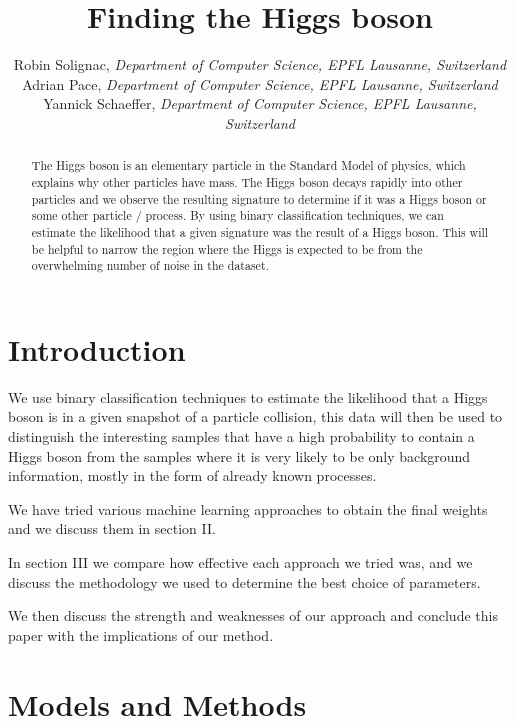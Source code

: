 \documentclass[10pt,conference,compsocconf]{IEEEtran}
\begin{document}
\title{Finding the Higgs boson}

\author{
  Robin Solignac,
  \textit{Department of Computer Science, EPFL Lausanne, Switzerland}\\
  Adrian Pace,
  \textit{Department of Computer Science, EPFL Lausanne, Switzerland}\\
  Yannick Schaeffer,
  \textit{Department of Computer Science, EPFL Lausanne, Switzerland}
}

\maketitle

\begin{abstract}
The Higgs boson is an elementary particle in the Standard Model of physics, which explains why other particles have mass. The Higgs boson decays rapidly into other particles and we observe the resulting signature to determine if it was a Higgs boson or some other particle / process. By using binary classification techniques, we can estimate the likelihood that a given signature was the result of a Higgs boson. This will be helpful to narrow the region where the Higgs is expected to be from the overwhelming number of noise in the dataset.
\end{abstract}

\section{Introduction}
We use binary classification techniques to estimate the likelihood that a Higgs boson is in a given snapshot of a particle collision, this data will then be used to distinguish the interesting samples that have a high probability to contain a Higgs boson from the samples where it is very likely to be only background information, mostly in the form of already known processes.

We have tried various machine learning approaches to obtain the final weights and we discuss them in section II.

In section III we compare how effective each approach we tried was, and we discuss the methodology we used to determine the best choice of parameters.

We then discuss the strength and weaknesses of our approach and conclude this paper with the implications of our method.

\section{Models and Methods}
\end{document}
